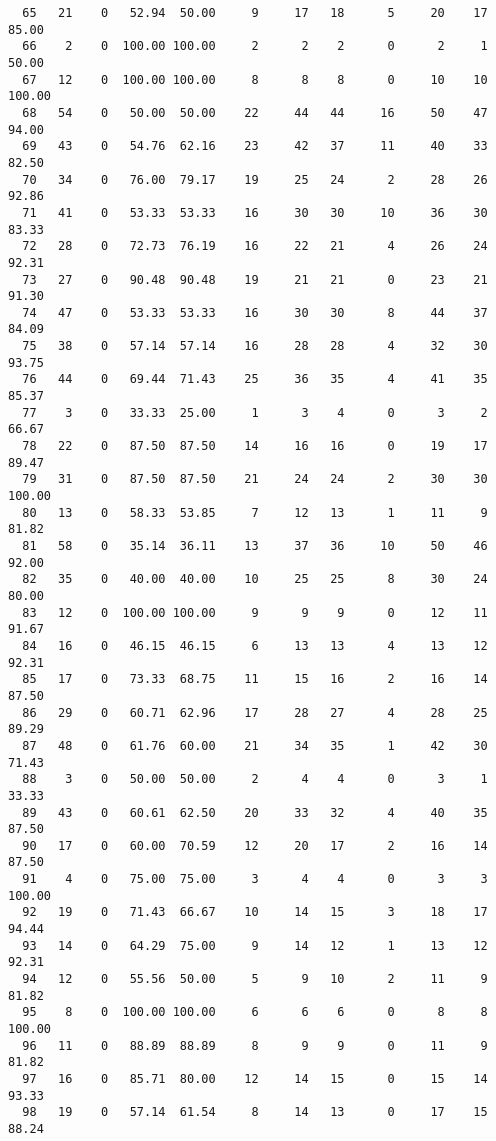 \begin{verbatim}
  65   21    0   52.94  50.00     9     17   18      5     20    17    85.00
  66    2    0  100.00 100.00     2      2    2      0      2     1    50.00
  67   12    0  100.00 100.00     8      8    8      0     10    10   100.00
  68   54    0   50.00  50.00    22     44   44     16     50    47    94.00
  69   43    0   54.76  62.16    23     42   37     11     40    33    82.50
  70   34    0   76.00  79.17    19     25   24      2     28    26    92.86
  71   41    0   53.33  53.33    16     30   30     10     36    30    83.33
  72   28    0   72.73  76.19    16     22   21      4     26    24    92.31
  73   27    0   90.48  90.48    19     21   21      0     23    21    91.30
  74   47    0   53.33  53.33    16     30   30      8     44    37    84.09
  75   38    0   57.14  57.14    16     28   28      4     32    30    93.75
  76   44    0   69.44  71.43    25     36   35      4     41    35    85.37
  77    3    0   33.33  25.00     1      3    4      0      3     2    66.67
  78   22    0   87.50  87.50    14     16   16      0     19    17    89.47
  79   31    0   87.50  87.50    21     24   24      2     30    30   100.00
  80   13    0   58.33  53.85     7     12   13      1     11     9    81.82
  81   58    0   35.14  36.11    13     37   36     10     50    46    92.00
  82   35    0   40.00  40.00    10     25   25      8     30    24    80.00
  83   12    0  100.00 100.00     9      9    9      0     12    11    91.67
  84   16    0   46.15  46.15     6     13   13      4     13    12    92.31
  85   17    0   73.33  68.75    11     15   16      2     16    14    87.50
  86   29    0   60.71  62.96    17     28   27      4     28    25    89.29
  87   48    0   61.76  60.00    21     34   35      1     42    30    71.43
  88    3    0   50.00  50.00     2      4    4      0      3     1    33.33
  89   43    0   60.61  62.50    20     33   32      4     40    35    87.50
  90   17    0   60.00  70.59    12     20   17      2     16    14    87.50
  91    4    0   75.00  75.00     3      4    4      0      3     3   100.00
  92   19    0   71.43  66.67    10     14   15      3     18    17    94.44
  93   14    0   64.29  75.00     9     14   12      1     13    12    92.31
  94   12    0   55.56  50.00     5      9   10      2     11     9    81.82
  95    8    0  100.00 100.00     6      6    6      0      8     8   100.00
  96   11    0   88.89  88.89     8      9    9      0     11     9    81.82
  97   16    0   85.71  80.00    12     14   15      0     15    14    93.33
  98   19    0   57.14  61.54     8     14   13      0     17    15    88.24

\end{verbatim}
